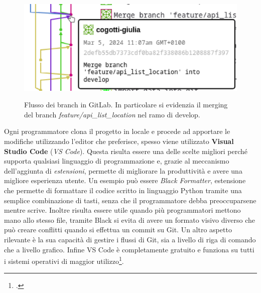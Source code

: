 \documentclass[./main.tex]{subfiles}
\begin{document}
\begin{figure}[!ht]
\noindent\begin{minipage}{0.5\textwidth}
\vspace{1cm}
\includegraphics[width=\textwidth]{images/ismarbo_merging.pdf}
\captionsetup{font=small, hypcap=false}
\label{fig:ismarbo_merging}
\end{minipage}
\hspace{0.05\textwidth}
\begin{minipage}{0.4\textwidth}
\begin{small}
Flusso dei branch in GitLab. In particolare si evidenzia il merging del branch \textit{feature/api\_list\_location} nel ramo di develop.
\end{small}
\end{minipage}
\vspace{0.25cm}
\end{figure}
Ogni programmatore clona il progetto in locale e procede ad apportare le modifiche utilizzando l'editor che preferisce, spesso viene utilizzato \textbf{Visual Studio Code} (\textit{VS Code}). Questa risulta essere una delle scelte migliori perché supporta qualsiasi linguaggio di programmazione e, grazie al meccanismo dell'aggiunta di \textit{estensioni}, permette di migliorare la produttività e avere una migliore esperienza utente. Un esempio può essere \textit{Black Formatter}, estensione che permette di formattare il codice scritto in linguaggio Python tramite una semplice combinazione di tasti, senza che il programmatore debba preoccuparsene mentre scrive. Inoltre risulta essere utile quando più programmatori mettono mano allo stesso file, tramite Black si evita di avere un formato visivo diverso che può creare conflitti quando si effettua un commit su Git. Un altro aspetto rilevante è la sua capacità di gestire i flussi di Git, sia a livello di riga di comando che a livello grafico. Infine VS Code è completamente gratuito e funziona su tutti i sistemi operativi di maggior utilizzo\footcite{website-vscode}.\par
\end{document}
